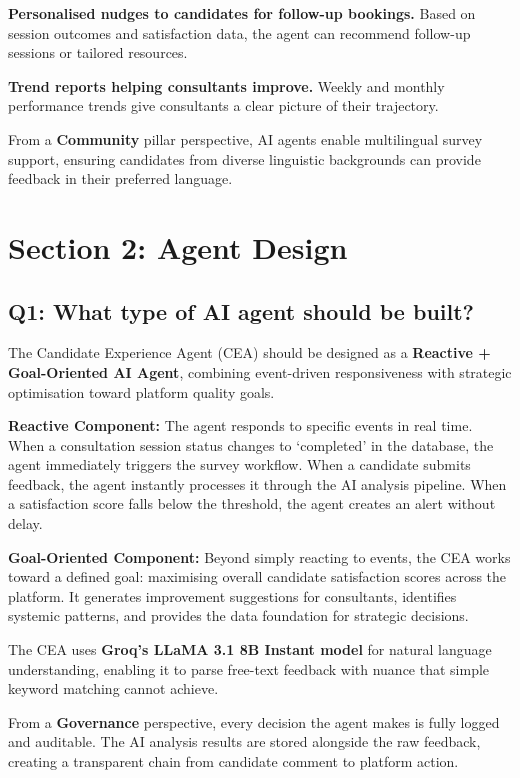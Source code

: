 \documentclass[11pt, a4paper]{article}
\begin{document}
\textbf{Personalised nudges to candidates for follow-up bookings.} Based on session outcomes and satisfaction data, the agent can recommend follow-up sessions or tailored resources.

\textbf{Trend reports helping consultants improve.} Weekly and monthly performance trends give consultants a clear picture of their trajectory.

From a \textbf{Community} pillar perspective, AI agents enable multilingual survey support, ensuring candidates from diverse linguistic backgrounds can provide feedback in their preferred language.

\section{Section 2: Agent Design}

\subsection{Q1: What type of AI agent should be built?}

The Candidate Experience Agent (CEA) should be designed as a \textbf{Reactive + Goal-Oriented AI Agent}, combining event-driven responsiveness with strategic optimisation toward platform quality goals.

\textbf{Reactive Component:} The agent responds to specific events in real time. When a consultation session status changes to `completed' in the database, the agent immediately triggers the survey workflow. When a candidate submits feedback, the agent instantly processes it through the AI analysis pipeline. When a satisfaction score falls below the threshold, the agent creates an alert without delay.

\textbf{Goal-Oriented Component:} Beyond simply reacting to events, the CEA works toward a defined goal: maximising overall candidate satisfaction scores across the platform. It generates improvement suggestions for consultants, identifies systemic patterns, and provides the data foundation for strategic decisions.

The CEA uses \textbf{Groq's LLaMA 3.1 8B Instant model} for natural language understanding, enabling it to parse free-text feedback with nuance that simple keyword matching cannot achieve.

From a \textbf{Governance} perspective, every decision the agent makes is fully logged and auditable. The AI analysis results are stored alongside the raw feedback, creating a transparent chain from candidate comment to platform action.
\end{document}
